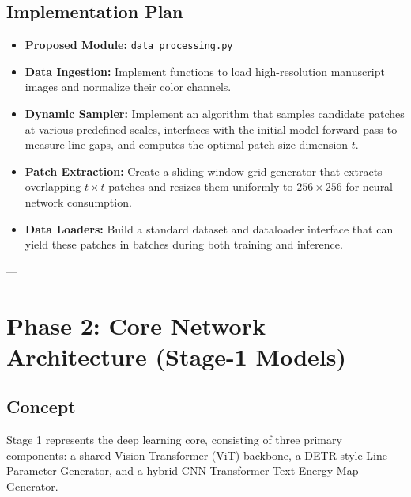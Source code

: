 \documentclass[12pt,a4paper]{article}
\begin{document}
\subsection{Implementation Plan}
\begin{itemize}
    \item \textbf{Proposed Module:} \texttt{data\_processing.py}
    \item \textbf{Data Ingestion:} Implement functions to load high-resolution manuscript images and normalize their color channels.
    \item \textbf{Dynamic Sampler:} Implement an algorithm that samples candidate patches at various predefined scales, interfaces with the initial model forward-pass to measure line gaps, and computes the optimal patch size dimension $t$.
    \item \textbf{Patch Extraction:} Create a sliding-window grid generator that extracts overlapping $t \times t$ patches and resizes them uniformly to $256 \times 256$ for neural network consumption.
    \item \textbf{Data Loaders:} Build a standard dataset and dataloader interface that can yield these patches in batches during both training and inference.
\end{itemize}

---

\section{Phase 2: Core Network Architecture (Stage-1 Models)}

\subsection{Concept}
Stage 1 represents the deep learning core, consisting of three primary components: a shared Vision Transformer (ViT) backbone, a DETR-style Line-Parameter Generator, and a hybrid CNN-Transformer Text-Energy Map Generator.
\end{document}
